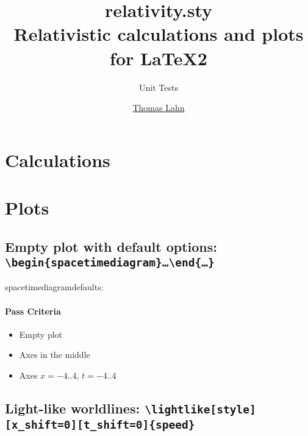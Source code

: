 \documentclass[pagesize,headsepline,parskip=half]{scrartcl}
\begin{document}
  \begin{titlepage}
    \title{relativity.sty\\Relativistic calculations and plots\\for \LaTeX2\varepsilon}
    \subtitle{Unit Tests}
    \author{\href{http://PointedEars.de/}{Thomas Lahn}}
    \maketitle
  \end{titlepage}

  \clearpage
  \begin{spacing}{1}
    \tableofcontents
    \thispagestyle{empty}
  \end{spacing}

  \clearpage

  \section{Calculations}
  \section{Plots}
    \subsection{Empty plot with default options:
        \texttt{\textbackslash{}begin\{spacetimediagram\}…\textbackslash{}end\{…\}}}
      \begin{spacetimediagram}[
        xmin=-4,
        xmax=4,
        ymin=-4,
        ymax=4
      ]
      \end{spacetimediagram}

      spacetimediagramdefaults:\\
      \spacetimediagramdefaults{}

      \paragraph{Pass Criteria}
        \begin{itemize}
          \item Empty plot
          \item Axes in the middle
          \item Axes $x = -4..4$, $t = -4..4$
        \end{itemize}

      \subsection{Light-like worldlines: \texttt{\textbackslash{}lightlike[style][x\_shift=0][t\_shift=0]\{speed\}}}
\end{document}

